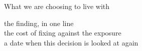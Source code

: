 
\begin{frame}{What we are choosing to live with}
  \begin{console}
   the finding, in one line\\
        the cost of fixing against the exposure\\
     a date when this decision is looked at again
  \end{console}
\end{frame}
